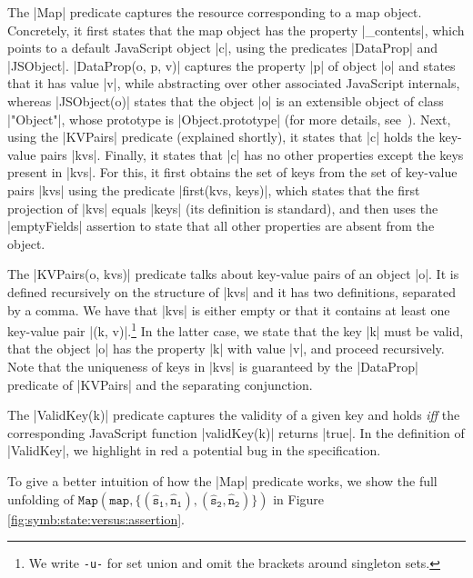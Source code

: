 The \jsinline|Map| predicate captures the resource corresponding to a map object. 
Concretely, it first states that the map object has the property \jsinline|_contents|, which points to a default JavaScript object \jsinline|c|, using the predicates \jsinline|DataProp| and \jsinline|JSObject|. 
\jsinline|DataProp(o, p, v)| captures the property \jsinline|p| of object \jsinline|o| and states that it has value \jsinline|v|, while abstracting over other associated JavaScript internals, whereas \jsinline|JSObject(o)| states that the object \jsinline|o| is an extensible object of class \jsinline|"Object"|, whose prototype is \jsinline|Object.prototype| (for more details, see~\cite{javert}). 
Next, using the \jsinline|KVPairs| predicate (explained shortly), it states that \jsinline|c| holds the key-value pairs \jsinline|kvs|. Finally, it states that \jsinline|c| has no other properties except the keys present in \jsinline|kvs|. For this, it first obtains the set of keys from the set of key-value pairs \jsinline|kvs| using the predicate \jsinline|first(kvs, keys)|, which states that the first projection of \jsinline|kvs| equals \jsinline|keys| (its definition is standard), and then uses the \jsinline|emptyFields| assertion to state that all other properties are absent from the object.

The \jsinline|KVPairs(o, kvs)| predicate talks about key-value pairs of an object \jsinline|o|. 
It is defined recursively on the structure of \jsinline|kvs| and it has two definitions, separated by a comma. 
We have that \jsinline|kvs| is either empty or that it contains at least one key-value pair \jsinline|(k, v)|.\footnote{We write {\small\texttt{-u-}} for set union and omit the brackets around singleton sets.} 
In the latter case, we state that the key \jsinline|k| must be valid, that the object \jsinline|o| has the property \jsinline|k| with value \jsinline|v|, and proceed recursively.
Note that the uniqueness of keys in \jsinline|kvs| is guaranteed by the \jsinline|DataProp| predicate of \jsinline|KVPairs| and the separating conjunction.

The \jsinline|ValidKey(k)| predicate captures the validity of a given key and holds \emph{iff} the corresponding JavaScript function \jsinline|validKey(k)| returns \jsinline|true|.
In the definition of \jsinline|ValidKey|, we highlight in red a potential bug in the specification.

To give a better intuition of how the \jsinline|Map| predicate works, we show the full unfolding of {\small$\mathtt{Map(map, \{ (\hat{s}_1, \hat{n}_1), (\hat{s}_2, \hat{n}_2) \} )}$} in Figure \ref{fig:symb:state:versus:assertion}.

